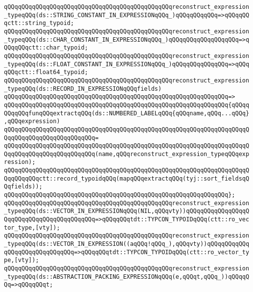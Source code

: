 \verb|qQQqqQQqqQQqqQQqqQQqqQQqqQQqqQQqqQQqqQQqqQQqqQQqreconstruct_expression_typeqQQq(ds::STRING_CONSTANT_IN_EXPRESSIONqQQq_)qQQqqQQqqQQq=>qQQqqQQqctt::string_typoid;|\newline
\verb|qQQqqQQqqQQqqQQqqQQqqQQqqQQqqQQqqQQqqQQqqQQqqQQqreconstruct_expression_typeqQQq(ds::CHAR_CONSTANT_IN_EXPRESSIONqQQq_)qQQqqQQqqQQqqQQqqQQq=>qQQqqQQqctt::char_typoid;|\newline
\verb|qQQqqQQqqQQqqQQqqQQqqQQqqQQqqQQqqQQqqQQqqQQqqQQqreconstruct_expression_typeqQQq(ds::FLOAT_CONSTANT_IN_EXPRESSIONqQQq_)qQQqqQQqqQQqqQQq=>qQQqqQQqctt::float64_typoid;|\newline
\newline
\verb|qQQqqQQqqQQqqQQqqQQqqQQqqQQqqQQqqQQqqQQqqQQqqQQqreconstruct_expression_typeqQQq(ds::RECORD_IN_EXPRESSIONqQQqfields)|\newline
\verb|qQQqqQQqqQQqqQQqqQQqqQQqqQQqqQQqqQQqqQQqqQQqqQQqqQQqqQQqqQQqqQQq=>|\newline
\verb|qQQqqQQqqQQqqQQqqQQqqQQqqQQqqQQqqQQqqQQqqQQqqQQqqQQqqQQqqQQqqQQq{qQQqqQQqqQQqfunqQQqextractqQQq(ds::NUMBERED_LABELqQQq{qQQqname,qQQq...qQQq},qQQqexpression)|\newline
\verb|qQQqqQQqqQQqqQQqqQQqqQQqqQQqqQQqqQQqqQQqqQQqqQQqqQQqqQQqqQQqqQQqqQQqqQQqqQQqqQQqqQQqqQQqqQQqqQQq=|\newline
\verb|qQQqqQQqqQQqqQQqqQQqqQQqqQQqqQQqqQQqqQQqqQQqqQQqqQQqqQQqqQQqqQQqqQQqqQQqqQQqqQQqqQQqqQQqqQQqqQQq(name,qQQqreconstruct_expression_typeqQQqexpression);|\newline
\newline
\verb|qQQqqQQqqQQqqQQqqQQqqQQqqQQqqQQqqQQqqQQqqQQqqQQqqQQqqQQqqQQqqQQqqQQqqQQqqQQqqQQqctt::record_typoidqQQq(mapqQQqextractqQQq(tyj::sort_fieldsqQQqfields));|\newline
\verb|qQQqqQQqqQQqqQQqqQQqqQQqqQQqqQQqqQQqqQQqqQQqqQQqqQQqqQQqqQQqqQQq};|\newline
\newline
\verb|qQQqqQQqqQQqqQQqqQQqqQQqqQQqqQQqqQQqqQQqqQQqqQQqreconstruct_expression_typeqQQq(ds::VECTOR_IN_EXPRESSIONqQQq(NIL,qQQqvty))qQQqqQQqqQQqqQQqqQQqqQQqqQQqqQQqqQQqqQQqqQQq=>qQQqqQQqtdt::TYPCON_TYPOIDqQQq(ctt::ro_vector_type,[vty]);|\newline
\verb|qQQqqQQqqQQqqQQqqQQqqQQqqQQqqQQqqQQqqQQqqQQqqQQqreconstruct_expression_typeqQQq(ds::VECTOR_IN_EXPRESSION((aqQQq!qQQq_),qQQqvty))qQQqqQQqqQQqqQQqqQQqqQQqqQQqqQQq=>qQQqqQQqtdt::TYPCON_TYPOIDqQQq(ctt::ro_vector_type,[vty]);|\newline
\verb|qQQqqQQqqQQqqQQqqQQqqQQqqQQqqQQqqQQqqQQqqQQqqQQqreconstruct_expression_typeqQQq(ds::ABSTRACTION_PACKING_EXPRESSIONqQQq(e,qQQqt,qQQq_))qQQqqQQq=>qQQqqQQqt;|\newline
